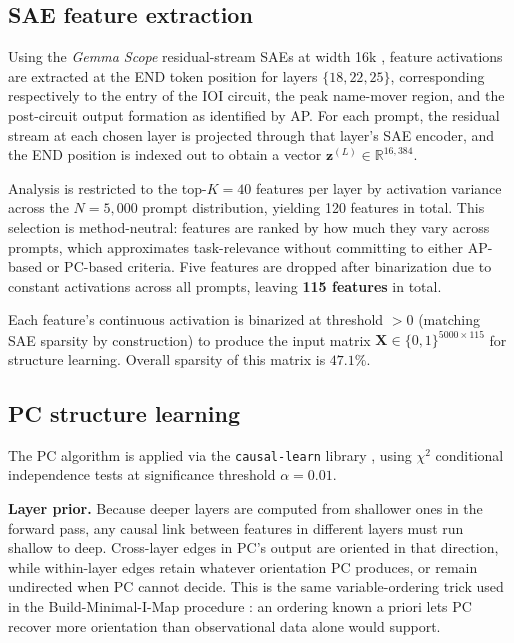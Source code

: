 \documentclass[conference]{IEEEtran}
\begin{document}
\subsection{SAE feature extraction}
Using the \emph{Gemma Scope} residual-stream SAEs at width 16k \cite{lieberum2024}, feature activations are extracted at the END token position for layers $\{18, 22, 25\}$, corresponding respectively to the entry of the IOI circuit, the peak name-mover region, and the post-circuit output formation as identified by AP. For each prompt, the residual stream at each chosen layer is projected through that layer's SAE encoder, and the END position is indexed out to obtain a vector $\mathbf{z}^{(L)} \in \mathbb{R}^{16{,}384}$.

Analysis is restricted to the top-$K = 40$ features per layer by activation variance across the $N = 5{,}000$ prompt distribution, yielding 120 features in total. This selection is method-neutral: features are ranked by how much they vary across prompts, which approximates task-relevance without committing to either AP-based or PC-based criteria. Five features are dropped after binarization due to constant activations across all prompts, leaving \textbf{115 features} in total.

Each feature's continuous activation is binarized at threshold $> 0$ (matching SAE sparsity by construction) to produce the input matrix $\mathbf{X} \in \{0, 1\}^{5000 \times 115}$ for structure learning. Overall sparsity of this matrix is $47.1\%$.

\subsection{PC structure learning}\label{sec:pclearn}
The PC algorithm \cite{spirtes1991} is applied via the \texttt{causal-learn} library \cite{zheng2024}, using $\chi^2$ conditional independence tests at significance threshold $\alpha = 0.01$.

\textbf{Layer prior.} Because deeper layers are computed from shallower ones in the forward pass, any causal link between features in different layers must run shallow to deep. Cross-layer edges in PC's output are oriented in that direction, while within-layer edges retain whatever orientation PC produces, or remain undirected when PC cannot decide. This is the same variable-ordering trick used in the Build-Minimal-I-Map procedure \cite{koller2009}: an ordering known a priori lets PC recover more orientation than observational data alone would support.
\end{document}
